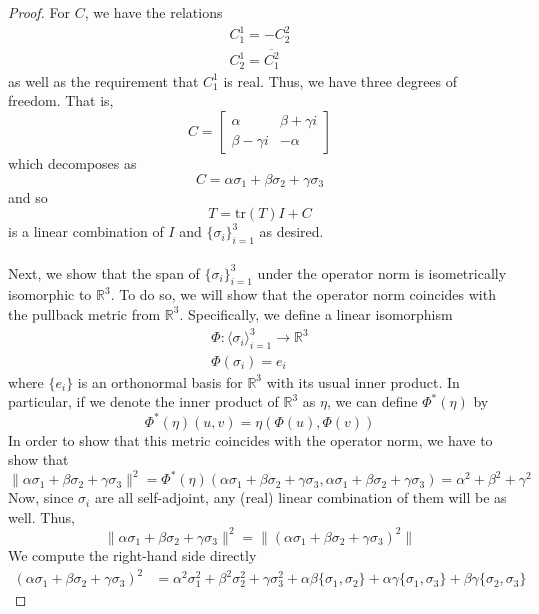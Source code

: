 \documentclass[fontsize=11pt]{scrartcl} %
\numberwithin{equation}{section} %
\numberwithin{figure}{section} %
\numberwithin{table}{section} %
\newcommand{\R}{\mathbb{R}}
\newcommand{\tr}{\textrm{tr}}
\begin{document}
\begin{proof}
    For $C$, we have the relations
    \[
        \begin{aligned}
        C^1_1 = -C^2_2\\
        C^1_2 = \overline{C^2_1}
    \end{aligned}
    \]
    as well as the requirement that $C^1_1$ is real. Thus, we have three degrees
    of freedom. That is,
    \[
        C = 
        \begin{bmatrix}
            \alpha &\beta+\gamma i\\
            \beta-\gamma i&-\alpha
        \end{bmatrix}
    \]
    which decomposes as
    \[
        C = \alpha\sigma_1 + \beta\sigma_2 +\gamma\sigma_3
    \]
    and so
    \[
        T = \tr(T)I + C
    \]
    is a linear combination of $I$ and $\{\sigma_i\}_{i=1}^3$ as desired.
    \\
    \\
    Next, we show that the span of $\{\sigma_i\}_{i=1}^3$ under the operator
    norm is isometrically isomorphic to $\R^3$. To do so, we will show that the
    operator norm coincides with the pullback metric from $\R^3$. Specifically,
    we define a linear isomorphism
    \[
        \begin{aligned}
        \Phi:\langle \sigma_i\rangle_{i=1}^3\to \R^3\\
        \Phi(\sigma_i) = e_i
    \end{aligned}
    \]
    where $\{e_i\}$ is an orthonormal basis for $\R^3$ with its usual inner
    product. In particular, if we denote the inner product of $\R^3$ as $\eta$,
    we can define $\Phi^*(\eta)$ by
    \[
        \Phi^*(\eta)(u,v) = \eta(\Phi(u),\Phi(v))
    \]
    In order to show that this metric coincides with the operator norm, we have
    to show that
    \[
        \|\alpha\sigma_1+\beta\sigma_2+\gamma\sigma_3\|^2 =
        \Phi^*(\eta)(\alpha\sigma_1+\beta\sigma_2+\gamma\sigma_3,
        \alpha\sigma_1+\beta\sigma_2+\gamma\sigma_3) = \alpha^2+\beta^2+\gamma^2
    \]
    Now, since $\sigma_i$ are all self-adjoint, any (real) linear combination of
    them will be as well. Thus,
    \[
    \|\alpha\sigma_1+\beta\sigma_2+\gamma\sigma_3\|^2 =
\|(\alpha\sigma_1+\beta\sigma_2+\gamma\sigma_3)^2\|
    \]
    We compute the right-hand side directly
    \[
\begin{aligned}
    (\alpha\sigma_1+\beta\sigma_2+\gamma\sigma_3)^2 &=
    \alpha^2\sigma_1^2 + \beta^2\sigma_2^2  + \gamma\sigma_3^2 +
    \alpha\beta\{\sigma_1,\sigma_2\} + \alpha\gamma\{\sigma_1,\sigma_3\} +
    \beta\gamma\{\sigma_2,\sigma_3\}

\end{aligned}\]
\end{proof}
\end{document}
